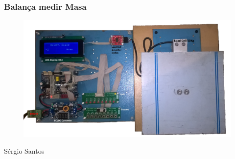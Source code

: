 \begin{frame}
\frametitle{Balança medir Masa}
\begin{minipage}{\linewidth}
	\begin{figure}[ht]
		\begin{center}
			\includegraphics[scale=0.1]{./image/PESTA/kit/Kit_Desenvolvimento_2}
		\end{center}
	\end{figure}
\end{minipage}
\newline
\vfill
\hfill {\tiny Sérgio Santos}
\end{frame}
